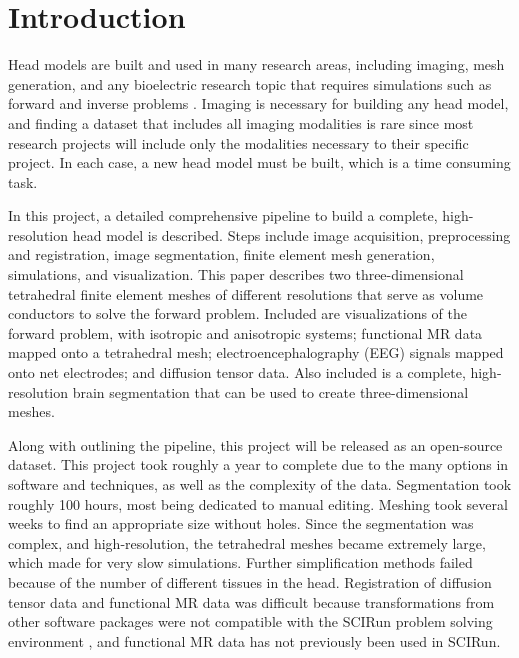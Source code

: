 
\section{Introduction}
\label{sec:intro}

Head models are built and used in many research areas, including imaging, mesh generation, and any bioelectric research topic that requires simulations such as forward and inverse problems \cite{ref:Brette2012}. Imaging is necessary for building any head model, and finding a dataset that includes all imaging modalities is rare since most research projects will include only the modalities necessary to their specific project. In each case, a new head model must be built, which is a time consuming task.

In this project, a detailed comprehensive pipeline to build a complete, high-resolution head model is described. Steps include image acquisition, preprocessing and registration, image segmentation, finite element mesh generation, simulations, and visualization. This paper describes two three-dimensional tetrahedral finite element meshes of different resolutions that serve as volume conductors to solve the forward problem. Included are visualizations of the forward problem, with isotropic and anisotropic systems; functional MR data mapped onto a tetrahedral mesh; electroencephalography (EEG) signals mapped onto net electrodes; and diffusion tensor data. Also included is a complete, high-resolution brain segmentation that can be used to create three-dimensional meshes. 

Along with outlining the pipeline, this project will be released as an open-source dataset. This project took roughly a year to complete due to the many options in software and techniques, as well as the complexity of the data. Segmentation took roughly 100 hours, most being dedicated to manual editing. Meshing took several weeks to find an appropriate size without holes. Since the segmentation was complex, and high-resolution, the tetrahedral meshes became extremely large, which made for very slow simulations. Further simplification methods failed because of the number of different tissues in the head. Registration of diffusion tensor data and functional MR data was difficult because transformations from other software packages were not compatible with the SCIRun problem solving environment \cite{ref:scirun}, and functional MR data has not previously been used in SCIRun.